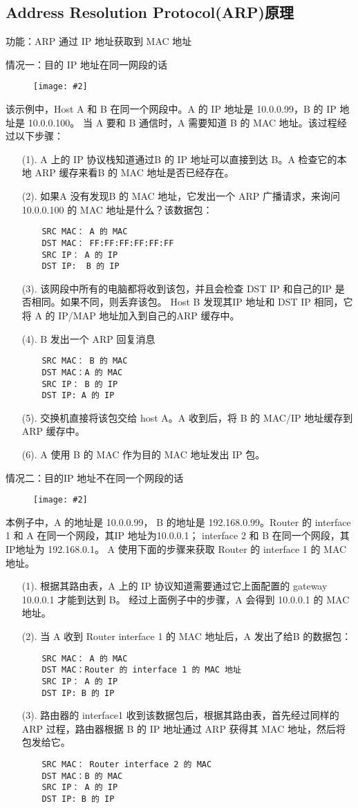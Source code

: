 \documentclass[a4paper,left=1.5cm,right=1.5cm,11pt]{article}
\newcommand{\sizedfic}[2]{\begin{figure}[H]
		\center
		\texttt{[image: \#2]}
	\end{figure}}
\begin{document}
\subsection{Address Resolution Protocol(ARP)原理}
功能：ARP 通过 IP 地址获取到 MAC 地址\par
情况一：目的 IP 地址在同一网段的话
\sizedfic{0.5}{arp_1.png}
该示例中，Host A 和 B 在同一个网段中。A 的 IP 地址是 10.0.0.99，B 的 IP 地址是 10.0.0.100。
当 A 要和 B 通信时，A 需要知道 B 的 MAC 地址。该过程经过以下步骤：
\begin{itemize}
	\item[(1).]A 上的 IP 协议栈知道通过B 的 IP 地址可以直接到达 B。A 检查它的本地 ARP 缓存来看B 的 MAC 地址是否已经存在。
	\item[(2).]如果A 没有发现B 的 MAC 地址，它发出一个 ARP 广播请求，来询问10.0.0.100 的 MAC 地址是什么？该数据包：
	\begin{lstlisting}
	SRC MAC： A 的 MAC
	DST MAC： FF:FF:FF:FF:FF:FF
	SRC IP： A 的 IP
	DST IP:  B 的 IP
	\end{lstlisting}
	\item[(3).]该网段中所有的电脑都将收到该包，并且会检查 DST IP 和自己的IP 是否相同。如果不同，则丢弃该包。
	Host B 发现其IP 地址和 DST IP 相同，它将 A 的 IP/MAP 地址加入到自己的ARP 缓存中。
	\item[(4).]B 发出一个 ARP 回复消息
	\begin{lstlisting}
	SRC MAC： B 的 MAC
	DST MAC：A 的 MAC
	SRC IP： B 的 IP
	DST IP: A 的 IP
	\end{lstlisting}
	\item[(5).]交换机直接将该包交给 host A。A 收到后，将 B 的 MAC/IP 地址缓存到 ARP 缓存中。
	\item[(6).]A 使用 B 的 MAC 作为目的 MAC 地址发出 IP 包。
\end{itemize}
情况二：目的IP 地址不在同一个网段的话
\sizedfic{0.5}{arp_2.png}
本例子中，A 的地址是 10.0.0.99， B 的地址是 192.168.0.99。Router 的 interface 1 和 A 在同一个网段，其IP 地址为10.0.0.1；
interface 2 和 B 在同一个网段，其IP地址为 192.168.0.1。 A 使用下面的步骤来获取 Router 的 interface 1 的 MAC 地址。
\begin{itemize}
	\item[(1).]根据其路由表，A 上的 IP 协议知道需要通过它上面配置的 gateway 10.0.0.1 才能到达到 B。
	经过上面例子中的步骤，A 会得到 10.0.0.1 的 MAC 地址。
	\item[(2).]当 A 收到 Router interface 1 的 MAC 地址后，A 发出了给B 的数据包：
	\begin{lstlisting}
	SRC MAC： A 的 MAC
	DST MAC：Router 的 interface 1 的 MAC 地址
	SRC IP： A 的 IP
	DST IP: B 的 IP
	\end{lstlisting}
	\item[(3).]路由器的 interface1 收到该数据包后，根据其路由表，首先经过同样的ARP 过程，路由器根据 B 的 IP 地址通过 ARP 获得其 MAC 地址，然后将包发给它。
	\begin{lstlisting}
	SRC MAC： Router interface 2 的 MAC
	DST MAC：B 的 MAC
	SRC IP： A 的 IP
	DST IP: B 的 IP
	\end{lstlisting}
\end{itemize}
\end{document}
